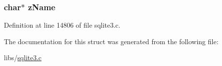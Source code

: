 \subsubsection[{z\+Name}]{\setlength{\rightskip}{0pt plus 5cm}char$\ast$ z\+Name}\label{struct_scan_status_a661118d86ac4127d40bf3be78d92117d}


Definition at line 14806 of file sqlite3.\+c.



The documentation for this struct was generated from the following file\+:\begin{DoxyCompactItemize}
\item 
libs/\hyperlink{sqlite3_8c}{sqlite3.\+c}\end{DoxyCompactItemize}
